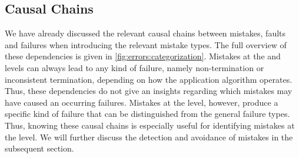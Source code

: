 



\subsection{Causal Chains}

We have already discussed the relevant causal chains between mistakes, faults and failures when introducing the relevant mistake types.
The full overview of these dependencies is given in \autoref{fig:errors:categorization}.
Mistakes at the \levelnetworkrelation and \levelnetworkrule levels can always lead to any kind of failure, namely non-termination or inconsistent termination, depending on how the application algorithm operates.
Thus, these dependencies do not give an insights regarding which mistakes may have caused an occurring failures.
Mistakes at the \leveltransformation level, however, produce a specific kind of failure that can be distinguished from the general failure types.
Thus, knowing these causal chains is especially useful for identifying mistakes at the \leveltransformation level.
We will further discuss the detection and avoidance of mistakes in the subsequent section.


